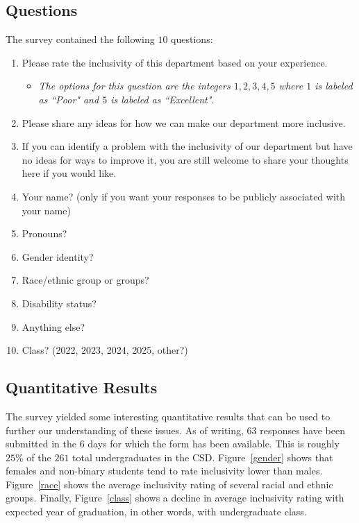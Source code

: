 \documentclass{article}
\begin{document}
\subsection{Questions}
The survey contained the following $10$ questions:
\begin{enumerate}
\item Please rate the inclusivity of this department based on your experience.	
\begin{itemize}
\item
\emph{The options for this question are the integers $1,2,3,4,5$ 
where $1$ is labeled as ``Poor" and $5$ is labeled as ``Excellent".}
\end{itemize}
\item Please share any ideas for how we can make our department more inclusive.	
\item If you can identify a problem with the inclusivity of our department but have no ideas for ways to improve it, you are still welcome to share your thoughts here if you would like.	
\item Your name? (only if you want your responses to be publicly associated with your name)	
\item Pronouns?	
\item Gender identity?	
\item Race/ethnic group or groups?	
\item Disability status?	
\item Anything else?	
\item Class? (2022, 2023, 2024, 2025, other?)
\end{enumerate}

\subsection{Quantitative Results}
The survey yielded some interesting quantitative results that can be 
used to further our understanding of these issues.
As of writing, $63$ responses have been submitted in the $6$ days for which the form
has been available.
This is roughly $25\%$ of the $261$ total undergraduates in the CSD.
Figure~\ref{gender} shows that females and non-binary students tend to rate inclusivity lower than males.
Figure~\ref{race} shows the average inclusivity rating of several racial 
and ethnic groups.
Finally, Figure~\ref{class} shows a decline in average inclusivity rating with 
expected year of graduation, in other words, with undergraduate class.
\end{document}
